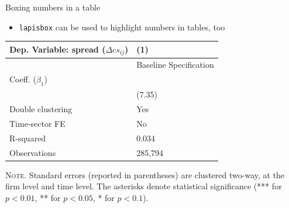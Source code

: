 \documentclass[10pt,itemsep]{beamer}
\begin{document}
\begin{frame}
    {Boxing numbers in a table}
    \begin{itemize}
        \item \texttt{lapisbox} can be used to highlight numbers in tables, too \bigskip
    \end{itemize}
    \begin{table}[th]
        \centering%
        \begin{minipage}[b]{.6\textwidth}
            \vspace{.2cm}\tablesize
            \begin{tabularx}{\textwidth}{lY}
                \toprule
                Dep. Variable: spread ($\Delta cs_{ij}$) 	& (1)\\
                \midrule
                & {Baseline Specification} \\
                \midrule
                 Coeff. ($\beta_1$) 		&   \\
                &   (7.35) \\
                \midrule
                 Double clustering 		& Yes \\
                Time-sector FE 												& No \\
                 R-squared 					& 0.034 \\
                Observations 												& 285,794 \\\bottomrule
            \end{tabularx}\vspace{.2cm}\newline
            \tiny{{\scshape Note.} Standard errors (reported in parentheses) are clustered two-way, at the firm level and time level. The asterisks denote statistical significance (*** for $p<0.01$, ** for $p<0.05$, * for $p<0.1$).\newline}%
            \label{tab:label}%
        \end{minipage}
    \end{table}
  \end{frame}
\shownotesblock{}
\end{document}
